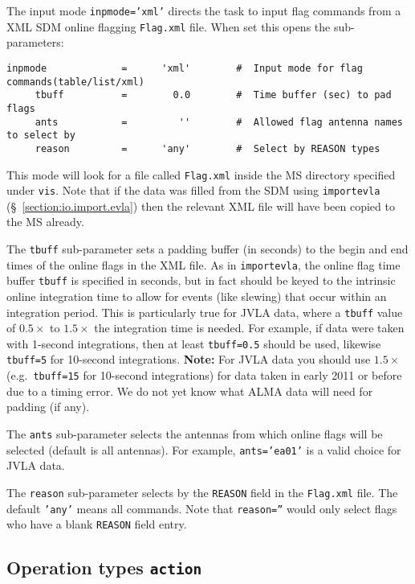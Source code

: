 The input mode {\tt inpmode='xml'} directs the
task to input flag commands from a XML SDM online flagging 
{\tt Flag.xml} file.  
When set this opens the sub-parameters:
\small
\begin{verbatim}
inpmode             =      'xml'        #  Input mode for flag commands(table/list/xml)
     tbuff          =        0.0        #  Time buffer (sec) to pad flags
     ants           =         ''        #  Allowed flag antenna names to select by
     reason         =      'any'        #  Select by REASON types
\end{verbatim}
\normalsize

This mode will look for a file called {\tt Flag.xml} inside the MS
directory specified under {\tt vis}.  Note that if the data was filled
from the SDM using {\tt importevla} (\S~\ref{section:io.import.evla})
then the relevant XML file will have been copied to the MS already.

The {\tt tbuff} sub-parameter sets a padding buffer (in seconds)
to the begin and end times of the online flags in the XML file.
As in {\tt importevla}, the online flag time buffer {\tt tbuff} is specified in
seconds, but in fact should be keyed to the intrinsic online 
integration time to allow for events (like slewing) that occur
within an integration period.  This is particularly true for JVLA data,
where a {\tt tbuff} value of $0.5\times$ to $1.5\times$ the
integration time is needed.  For example, if data were taken with
1-second integrations, then at least {\tt tbuff=0.5} should be used,
likewise {\tt tbuff=5} for 10-second integrations.
{\bf Note:} For JVLA data you should use $1.5\times$ (e.g.\ 
{\tt tbuff=15} for 10-second integrations) for data taken in 
early 2011 or before due to a timing error.  We do not yet know what
ALMA data will need for padding (if any).

The {\tt ants} sub-parameter selects the antennas from which
online flags will be selected (default is all antennas).  For example,
{\tt ants='ea01'} is a valid choice for JVLA data.

The {\tt reason} sub-parameter selects by the {\tt REASON} field in
the {\tt Flag.xml} file.  The default {\tt 'any'} means all commands.
Note that {\tt reason=''} would only select flags who have a blank {\tt REASON}
field entry.


\subsection{Operation types {\tt action}}
\label{section:edit.flagcmd.action}

